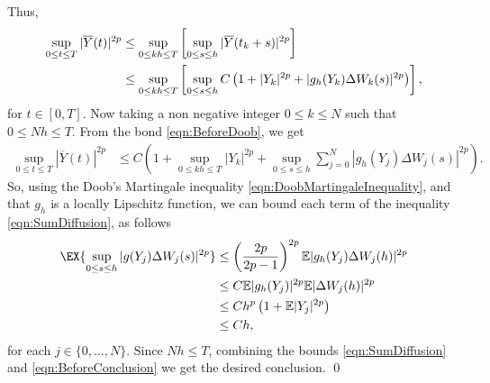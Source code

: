 \documentclass[3p]{elsarticle}
\theoremstyle{definition}
\theoremstyle{plain}%
\theoremstyle{remark}
\newcommand{\m}[1]{\mathbb{E}#1}
\begin{document}
	Thus, 
	\begin{align}
		\sup_{0\leq t\leq T} |\overline{Y}(t)|^{2p}
		&\leq
			\sup_{0\leq kh\leq T}
			\left[
				\sup_{0\leq s\leq h}
					|\overline{Y}(t_k+s)|^{2p} 
			\right] 
		\notag\\
		&\leq
			\sup_{0\leq kh\leq T} 
			\left[
				\sup_{0\leq s\leq h}
					C 
					\left(
						1 + |Y_k|^{2p} + |g_h(Y_k)\Delta W_k(s)|^{2p}
					\right)
			\right],
		\label{eqn:BeforeDoob}
	\end{align}
	for $t\in [0,T]$.
	Now taking a non negative integer $0 \leq k \leq N$ such that $0\leq Nh \leq T$. From the bond 
	\eqref{eqn:BeforeDoob}, we get
	\begin{align}
		\sup_{0\leq t\leq T} |\overline{Y}(t)|^{2p}
		&\leq 
			C
			\left(
				1
				+
				\sup_{0\leq kh\leq T} 
					|Y_k|^{2p}
					+
					\sup_{0\leq s\leq h}
						\sum_{j=0}^N
							|g_h(Y_j)\Delta W_j(s)|^{2p}
			\right) \label{eqn:SumDiffusion}.
	\end{align}
	So, using the Doob's Martingale inequality \eqref{eqn:DoobMartingaleInequality},
	 and that $g_h$ is a locally 
	Lipschitz function, we can bound each term of the inequality \eqref{eqn:SumDiffusion},  as follows
	\begin{align}
		\EX{
			\sup_{0 \leq s \leq h} |g(Y_j) \Delta W_j(s)|^{2p}
		}
		&\leq
			\left(
				\frac{2p}{2p-1}
			\right)^{2p}
			\m|g_h(Y_j)\Delta W_j(h)|^{2p}
			\notag
			\\
		&\leq
			C \m |g_h(Y_j)|^{2p} \m |\Delta W_j(h)|^{2p} \notag\\
		&\leq
			C h^p
			\left(
				1 + \m|Y_j|^{2p}
			\right) \notag \\
		& \leq C h, \label{eqn:BeforeConclusion}
	\end{align}
	for each $j \in \{0,\dots, N\}$.
	Since $Nh\leq T$, combining the bounds \eqref{eqn:SumDiffusion} and \eqref{eqn:BeforeConclusion} we 
	get the desired conclusion. \qed
\end{document}
